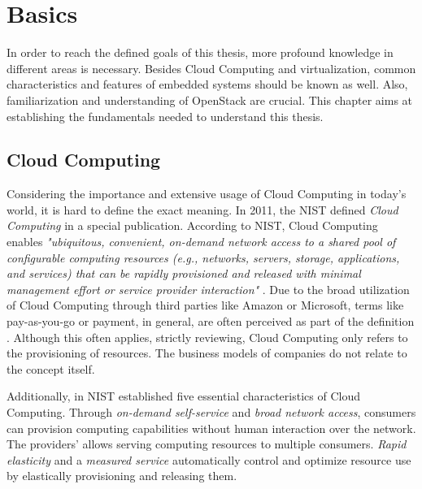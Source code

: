 \chapter{Basics}
\label{chapter:basics}
    
    In order to reach the defined goals of this thesis, more profound knowledge in different areas is necessary.
    Besides Cloud Computing and virtualization, common characteristics and features of embedded systems should be known as well.
    Also, familiarization and understanding of OpenStack are crucial.    
    This chapter aims at establishing the fundamentals needed to understand this thesis.
    
    
    \section{Cloud Computing}
    \label{section:cloud}
        
        Considering the importance and extensive usage of Cloud Computing in today's world, it is hard to define the exact meaning.
        In 2011, the \ac{NIST} defined \textsl{Cloud Computing} in a special publication. 
        According to \ac{NIST}, Cloud Computing enables \textsl{"ubiquitous, convenient, on-demand network access to a shared pool of configurable computing resources (e.g., networks, servers, storage, applications, and services) that can be rapidly provisioned and released with minimal management effort or service provider interaction"} \cite{Mell2011}.
        Due to the broad utilization of Cloud Computing through third parties like Amazon or Microsoft, terms like pay-as-you-go or payment, in general, are often perceived as part of the definition \cite{Repschlager2010,Amazon2020}.
        Although this often applies, strictly reviewing, Cloud Computing only refers to the provisioning of resources.
        The business models of companies do not relate to the concept itself.
        
        \noindent Additionally, in \cite{Mell2011} \ac{NIST} established five essential characteristics of Cloud Computing.
        Through \textsl{on-demand self-service} and \textsl{broad network access}, consumers can provision computing capabilities without human interaction over the network.
        The providers'  allows serving computing resources to multiple consumers.
        \textsl{Rapid elasticity} and a \textsl{measured service} automatically control and optimize resource use by elastically provisioning and releasing them.
        
